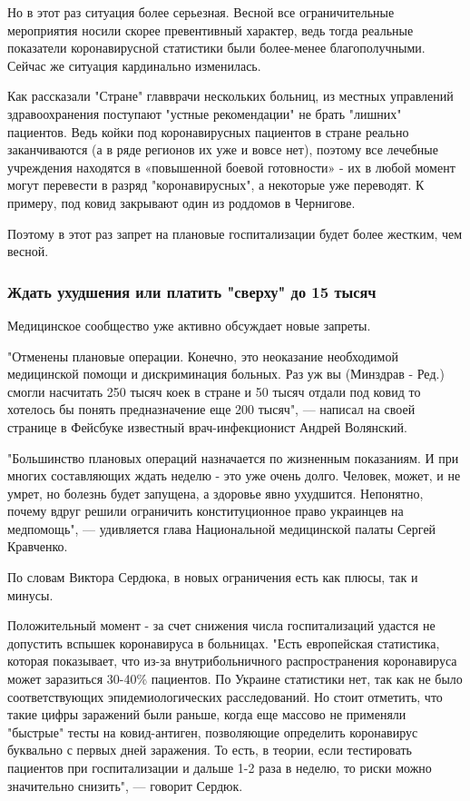 Но в этот раз ситуация более серьезная. Весной все ограничительные мероприятия
носили скорее превентивный характер, ведь тогда реальные показатели
коронавирусной статистики были более-менее благополучными. Сейчас же ситуация
кардинально изменилась.

Как рассказали "Стране" главврачи нескольких больниц, из местных управлений
здравоохранения поступают "устные рекомендации" не брать "лишних" пациентов.
Ведь койки под коронавирусных пациентов в стране реально заканчиваются (а в
ряде регионов их уже и вовсе нет), поэтому все лечебные учреждения находятся в
«повышенной боевой готовности» - их в любой момент могут перевести в разряд
"коронавирусных", а некоторые уже переводят. К примеру, под ковид закрывают
один из роддомов в Чернигове.

Поэтому в этот раз запрет на плановые госпитализации будет более жестким, чем
весной.

\subsubsection{Ждать ухудшения или платить "сверху" до 15 тысяч}

Медицинское сообщество уже активно обсуждает новые запреты.

"Отменены плановые операции. Конечно, это неоказание необходимой медицинской
помощи и дискриминация больных. Раз уж вы (Минздрав - Ред.) смогли насчитать
250 тысяч коек в стране и 50 тысяч отдали под ковид то хотелось бы понять
предназначение еще 200 тысяч", --- написал на своей странице в Фейсбуке известный
врач-инфекционист Андрей Волянский.

"Большинство плановых операций назначается по жизненным показаниям. И при
многих составляющих ждать неделю - это уже очень долго. Человек, может, и не
умрет, но болезнь будет запущена, а здоровье явно ухудшится. Непонятно, почему
вдруг решили ограничить конституционное право украинцев на медпомощь", —
удивляется глава Национальной медицинской палаты Сергей Кравченко. 

По словам Виктора Сердюка, в новых ограничения есть как плюсы, так и минусы.

Положительный момент - за счет снижения числа госпитализаций удастся не
допустить вспышек коронавируса в больницах. "Есть европейская статистика,
которая показывает, что из-за внутрибольничного распространения коронавируса
может заразиться 30-40\% пациентов. По Украине статистики нет, так как не было
соответствующих эпидемиологических расследований. Но стоит отметить, что такие
цифры заражений были раньше, когда еще массово не применяли "быстрые" тесты на
ковид-антиген, позволяющие определить коронавирус буквально с первых дней
заражения. То есть, в теории, если тестировать пациентов при госпитализации и
дальше 1-2 раза в неделю, то риски можно значительно снизить", --- говорит
Сердюк.

